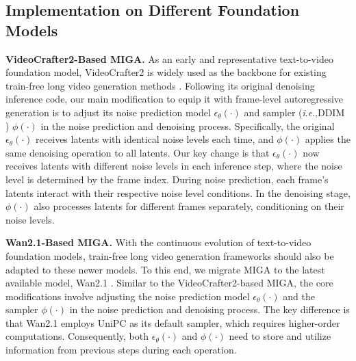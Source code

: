 \documentclass{article}
\theoremstyle{plain}
\theoremstyle{definition}
\theoremstyle{remark}
\newcommand{\ie}{\textit{i}.\textit{e}.}
\begin{document}
\subsection{Implementation on Different Foundation Models}
\label{app:imple_different_models}
\textbf{VideoCrafter2-Based MIGA.}
As an early and representative text-to-video foundation model, VideoCrafter2 \cite{chen2023videocrafter1,chen2024videocrafter2} is widely used as the backbone for existing train-free long video generation methods \cite{qiu2023freenoise,tan2025freepca,lu2024freelong,kim2024fifo,yang2025scalingnoise}.
Following its original denoising inference code, our main modification to equip it with frame-level autoregressive generation is to adjust its noise prediction model $\epsilon_{\theta}(\cdot)$ and sampler (\ie,DDIM \cite{song2020denoising}) $\phi(\cdot)$ in the noise prediction and denoising process.
Specifically, the original $\epsilon_{\theta}(\cdot)$ receives latents with identical noise levels each time, and $\phi(\cdot)$ applies the same denoising operation to all latents.
Our key change is that $\epsilon_{\theta}(\cdot)$ now receives latents with different noise levels in each inference step, where the noise level is determined by the frame index.
During noise prediction, each frame’s latents interact with their respective noise level conditions.  
In the denoising stage, $\phi(\cdot)$ also processes latents for different frames separately, conditioning on their noise levels.



\textbf{Wan2.1-Based MIGA.}
With the continuous evolution of text-to-video foundation models, train-free long video generation frameworks should also be adapted to these newer models.
To this end, we migrate MIGA to the latest available model, Wan2.1 \cite{wan2025wan}. 
Similar to the VideoCrafter2-based MIGA, the core modifications involve adjusting the noise prediction model $\epsilon_{\theta}(\cdot)$ and the sampler $\phi(\cdot)$ in the noise prediction and denoising process.
The key difference is that Wan2.1 employs UniPC \cite{zhao2023unipc} as its default sampler, which requires higher-order computations. Consequently, both $\epsilon_{\theta}(\cdot)$ and $\phi(\cdot)$ need to store and utilize information from previous steps during each operation.
\end{document}
